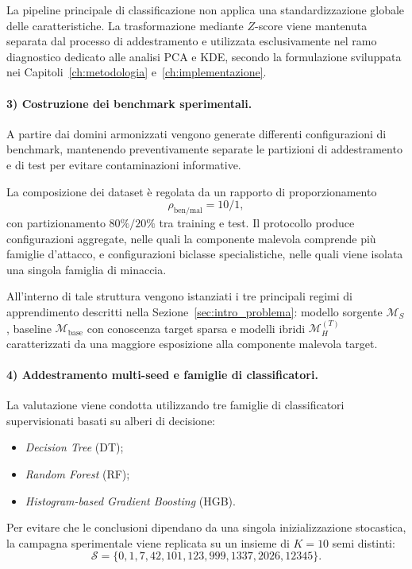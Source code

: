 La pipeline principale di classificazione non applica una standardizzazione globale delle caratteristiche. 
La trasformazione mediante $Z$-score viene mantenuta separata dal processo di addestramento e utilizzata esclusivamente nel ramo diagnostico dedicato alle analisi PCA e KDE, secondo la formulazione sviluppata nei Capitoli~\ref{ch:metodologia} e~\ref{ch:implementazione}.

\paragraph{3) Costruzione dei benchmark sperimentali.}
A partire dai domini armonizzati vengono generate differenti configurazioni di benchmark, mantenendo preventivamente separate le partizioni di addestramento e di test per evitare contaminazioni informative.

La composizione dei dataset è regolata da un rapporto di proporzionamento
\[
    \rho_{\mathrm{ben}/\mathrm{mal}} = 10/1,
\]
con partizionamento $80\%/20\%$ tra training e test. 
Il protocollo produce configurazioni aggregate, nelle quali la componente malevola comprende più famiglie d'attacco, e configurazioni biclasse specialistiche, nelle quali viene isolata una singola famiglia di minaccia.

All'interno di tale struttura vengono istanziati i tre principali regimi di apprendimento descritti nella Sezione~\ref{sec:intro_problema}: modello sorgente $\mathcal{M}_{S}$, baseline $\mathcal{M}_{\mathrm{base}}$ con conoscenza target sparsa e modelli ibridi $\mathcal{M}_{H}^{(T)}$ caratterizzati da una maggiore esposizione alla componente malevola target.

\paragraph{4) Addestramento multi-seed e famiglie di classificatori.}
La valutazione viene condotta utilizzando tre famiglie di classificatori supervisionati basati su alberi di decisione:
\begin{itemize}
    \item \textit{Decision Tree} (DT);
    \item \textit{Random Forest} (RF);
    \item \textit{Histogram-based Gradient Boosting} (HGB).
\end{itemize}

Per evitare che le conclusioni dipendano da una singola inizializzazione stocastica, la campagna sperimentale viene replicata su un insieme di $K=10$ semi distinti:
\begin{equation}
    \mathcal{S} =
    \{0,1,7,42,101,123,999,1337,2026,12345\}.
\end{equation}

